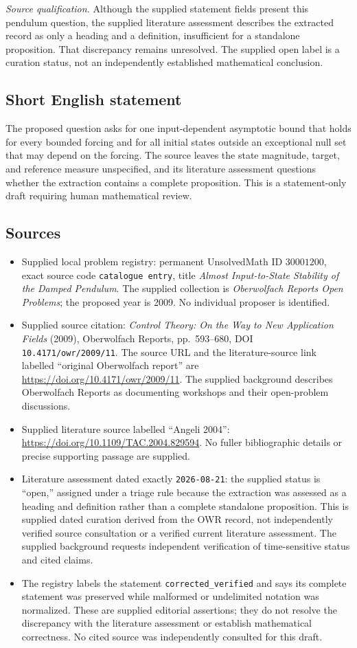 \documentclass[11pt]{article}
\begin{document}
\textit{Source qualification.} Although the supplied statement fields present this pendulum question, the supplied literature assessment describes the extracted record as only a heading and a definition, insufficient for a standalone proposition. That discrepancy remains unresolved. The supplied open label is a curation status, not an independently established mathematical conclusion.
\subsection{Short English statement}
The proposed question asks for one input-dependent asymptotic bound that holds for every bounded forcing and for all initial states outside an exceptional null set that may depend on the forcing. The source leaves the state magnitude, target, and reference measure unspecified, and its literature assessment questions whether the extraction contains a complete proposition. This is a statement-only draft requiring human mathematical review.
\subsection{Sources}
\begin{itemize}
\item Supplied local problem registry: permanent UnsolvedMath ID \(30001200\), exact source code \texttt{catalogue entry}, title \emph{Almost Input-to-State Stability of the Damped Pendulum}. The supplied collection is \emph{Oberwolfach Reports Open Problems}; the proposed year is 2009. No individual proposer is identified.
\item Supplied source citation: \emph{Control Theory: On the Way to New Application Fields} (2009), Oberwolfach Reports, pp.\ 593--680, DOI \texttt{10.4171/owr/2009/11}. The source URL and the literature-source link labelled ``original Oberwolfach report'' are \url{https://doi.org/10.4171/owr/2009/11}. The supplied background describes Oberwolfach Reports as documenting workshops and their open-problem discussions.
\item Supplied literature source labelled ``Angeli 2004'': \url{https://doi.org/10.1109/TAC.2004.829594}. No fuller bibliographic details or precise supporting passage are supplied.
\item Literature assessment dated exactly \texttt{2026-08-21}: the supplied status is ``open,'' assigned under a triage rule because the extraction was assessed as a heading and definition rather than a complete standalone proposition. This is supplied dated curation derived from the OWR record, not independently verified source consultation or a verified current literature assessment. The supplied background requests independent verification of time-sensitive status and cited claims.
\item The registry labels the statement \texttt{corrected\_verified} and says its complete statement was preserved while malformed or undelimited notation was normalized. These are supplied editorial assertions; they do not resolve the discrepancy with the literature assessment or establish mathematical correctness. No cited source was independently consulted for this draft.
\end{itemize}
\end{document}
